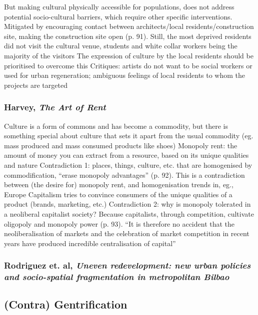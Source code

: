 \documentclass{article}
\begin{document}
\begin{outline}
	\1 But making cultural physically accessible for populations, does not address potential socio-cultural barriers, which require other specific interventions. Mitigated by encouraging contact between architects/local residents/construction site, making the construction site open (p. 91). Still, the most deprived residents did not visit the cultural venue, students and white collar workers being the majority of the visitors 
	\1 The expression of culture by the local residents should be prioritised to overcome this
	\1 Critiques: artists do not want to be social workers or used for urban regeneration; ambiguous feelings of local residents to whom the projects are targeted 
\end{outline}

\subsubsection{Harvey, \textit{The Art of Rent}}

\begin{outline}
	\1 Culture is a form of commons and has become a commodity, but there is something special about culture that sets it apart from the usual commodity (eg. mass produced and mass consumed products like shoes) 
	\1 Monopoly rent: the amount of money you can extract from a resource, based on its unique qualities and nature
	\1 Contradiction 1: places, things, culture, etc. that are homogenised by commodification, ``erase monopoly advantages'' (p. 92). This is a contradiction between (the desire for) monopoly rent, and homogenisation trends in, eg., Europe
		\2 Capitalism tries to convince consumers of the unique qualities of a product (brands, marketing, etc.)
	\1 Contradiction 2: why is monopoly tolerated in a neoliberal capitalist society? Because capitalists, through competition, cultivate oligopoly and monopoly power (p. 93). ``It is therefore no accident that the neoliberalisation of markets and the celebration of market competition in recent years have produced incredible centralisation of capital''
	\1 
\end{outline}

\subsubsection{Rodriguez et. al, \textit{Uneven redevelopment: new urban policies and socio-spatial fragmentation in metropolitan Bilbao}}


\subsection{(Contra) Gentrification}
\end{document}
